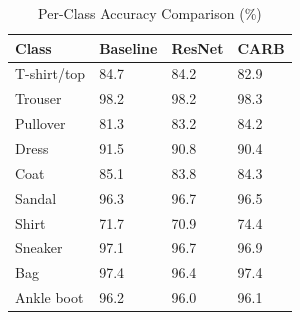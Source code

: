 \begin{table}
\caption{Per-Class Accuracy Comparison (\%)}
\label{tab:perclass}
\begin{tabular}{llll}
\toprule
Class & Baseline & ResNet & CARB \\
\midrule
T-shirt/top & 84.7 & 84.2 & 82.9 \\
Trouser & 98.2 & 98.2 & 98.3 \\
Pullover & 81.3 & 83.2 & 84.2 \\
Dress & 91.5 & 90.8 & 90.4 \\
Coat & 85.1 & 83.8 & 84.3 \\
Sandal & 96.3 & 96.7 & 96.5 \\
Shirt & 71.7 & 70.9 & 74.4 \\
Sneaker & 97.1 & 96.7 & 96.9 \\
Bag & 97.4 & 96.4 & 97.4 \\
Ankle boot & 96.2 & 96.0 & 96.1 \\
\bottomrule
\end{tabular}
\end{table}
